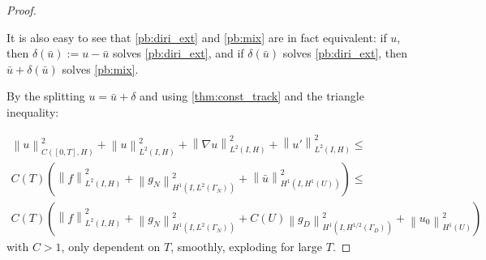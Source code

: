 \documentclass[english,a4paper,9pt,oneside]{scrbook}	%
\theoremstyle{break}
\newenvironment{mproof}[1][\proofname]{%
  \begin{proof}[#1]$ $\par\nobreak\ignorespaces
}{%
  \end{proof}
}
\renewcommand*{\proofname}{Proof}
\theoremstyle{remark}
\newcommand{\norm}[1]{\left\lVert#1\right\rVert}
\begin{document}
\begin{appendices}
\begin{mproof}
It is also easy to see that \cref{pb:diri_ext} and \cref{pb:mix} are in fact equivalent: if $u$, then $\delta(\bar{u}):=u-\bar{u}$ solves \cref{pb:diri_ext}, and if $\delta(\bar{u})$ solves  \cref{pb:diri_ext}, then $\bar{u}+\delta(\bar{u})$ solves \cref{pb:mix}.

By the splitting $u=\bar{u} + \delta$ and using \cref{thm:const_track} and the triangle inequality:

\begin{align*}
	\norm{u}_{C([0,T],H)}^2 + \norm{u}^2_{L^2(I,H)}+\norm{\nabla u}^2_{L^2(I,H)} + \norm{u'}^2_{L^2(I,H)} \leq \\
	C(T)\left (  \norm{f}_{L^2(I,H)}^2 +  \norm{g_N}^2_{H^1(I,L^2(\Gamma_N))}  + \norm{\bar{u}}^2_{H^1(I,H^1(U))}\right )  \leq \\
	C(T)\left (  \norm{f}_{L^2(I,H)}^2 +  \norm{g_N}^2_{H^1(I,L^2(\Gamma_N))} + C(U) \norm{g_D}^2_{H^1(I,H^{1/2}(\Gamma_D))} + \norm{u_0}^2_{H^1(U)}\right )
\end{align*} 
with $C>1$, only dependent on $T$, smoothly, exploding for large $T$.

\end{mproof}
\end{appendices}
\end{document}
